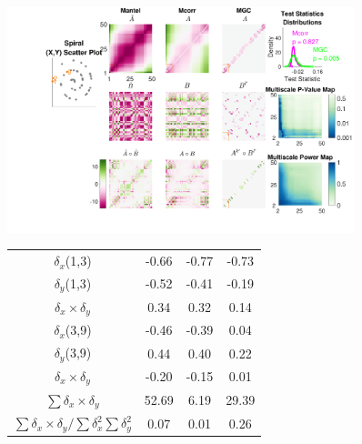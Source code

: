 \documentclass[11pt]{article}
\begin{document}
\begin{figure}[htbp]
\includegraphics[width=0.9\textwidth,trim={5cm 0 0 0},clip]{../Figures/FigA}
\begin{center}
\begin{tabular}{c  c  c  c}
 $\delta_x$(1,3) & \hspace{1.8em} \color{magenta}-0.66 \hspace{1.8em}  & \hspace{1.8em} \color{magenta}-0.77 \hspace{1.8em} & \hspace{1.8em} \color{magenta}-0.73 \hspace{1.8em}  \\ 
 $\delta_y$(1,3) & \color{magenta}-0.52 & \color{magenta}-0.41 & \color{magenta}-0.19  \\ 
 $\delta_x \times \delta_y$ & \color{green}0.34 & \color{green}0.32 & \color{green}0.14  \\ 
 
\hline


 $\delta_x$(3,9) & \color{magenta}-0.46 & \color{magenta}-0.39 & \color{green}0.04  \\ 
 $\delta_y$(3,9) &  \color{green}0.44 & \color{green}0.40 & \color{green}0.22  \\ 
 $\delta_x \times \delta_y$ & \color{magenta}-0.20 & \color{magenta}-0.15 & \color{green}0.01  \\ 

\hline
 $\sum{\delta_x \times \delta_y}$ &  52.69   & 6.19 & 29.39  \\ 
$\sum{\delta_x \times \delta_y} / \sum{\delta_{x}^2}\sum{\delta_{y}^2}$ &  0.07  & 0.01 & 0.26  \\ 


\end{tabular}
\end{center}
\end{figure}
\end{document}
